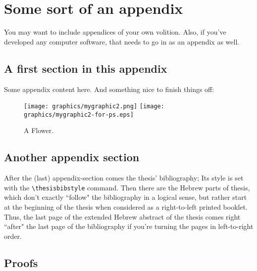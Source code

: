 \chapter{Some sort of an appendix}
\label{appendix:somesort}

You may want to include appendices of your own volition. Also, if you've developed any computer software, that needs to go in as an appendix as well.

\section{A first section in this appendix}

Some appendix content here. And something nice to finish things off:

\begin{figure}[htb]
  \centering
  \ifpdf
    \texttt{[image: graphics/mygraphic2.png]}
  \else
    \texttt{[image: graphics/mygraphic2-for-ps.eps]}
  \fi
  \caption{A Flower.}
\end{figure}

\section{Another appendix section}
After the (last) appendix-section comes the thesis' bibliography; Its style is set with the \verb|\thesisbibstyle| command. Then there are the Hebrew parts of thesis, which don't exactly ``follow" the bibliography in a logical sense, but rather start at the beginning of the thesis when considered as a right-to-left printed booklet. Thus, the last page of the extended Hebrew abstract of the thesis comes right ``after" the last page of the bibliography if you're turning the pages in left-to-right order.


\section{Proofs}
